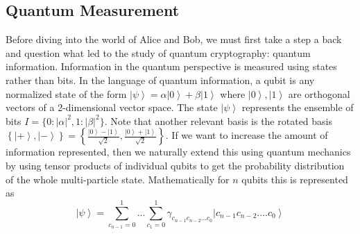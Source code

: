 \documentclass[aps,prd,final,twocolumn,letterpaper]{revtex4}
\newcommand{\ket}[1]{\left|#1\right\rangle}
\begin{document}
\subsection{Quantum Measurement}
Before diving into the world of Alice and Bob, we must first take a step a back and question what led to the study of quantum cryptography: quantum information. Information in the quantum perspective is measured using states rather than bits. In the language of quantum information, a qubit is any normalized state of the form $\ket{\psi} = \alpha\ket{0}+\beta\ket{1}$ where $\ket{0}, \ket{1}$ are orthogonal vectors of a 2-dimensional vector space. The state $\ket{\psi}$ represents the ensemble of bits $I=\{0:|\alpha|^2, 1:|\beta|^2\}$. Note that another relevant basis is the rotated basis $\left\{\ket{+}, \ket{-}\right\} =\left\{\frac{\ket{0}-\ket{1}}{\sqrt{2}}, \frac{\ket{0}+\ket{1}}{\sqrt{2}}\right\}$. If we want to increase the amount of information represented, then we naturally extend this using quantum mechanics by using tensor products of individual qubits to get the probability distribution of the whole multi-particle state. Mathematically for $n$ qubits this is represented as
\begin{equation}\ket{\psi} =\displaystyle\sum_{c_{n-1}=0}^{1} ... \sum_{c_1=0}^{1} \gamma_{c_{n-1} c_{n-2}...c_{0}} \ket{c_{n-1}c_{n-2}....c_0}
\end{equation}
\end{document}
